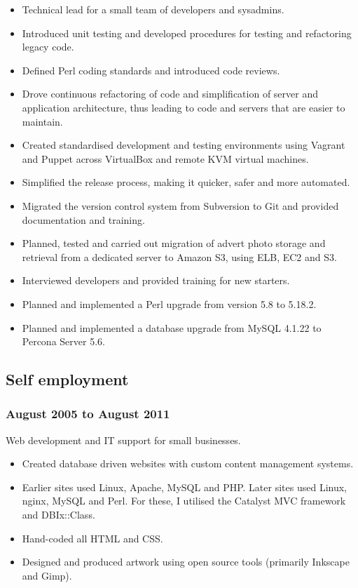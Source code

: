 \documentclass[10pt]{article}
\begin{document}
\begin{itemize}
    \item Technical lead for a small team of developers and sysadmins.
    \item Introduced unit testing and developed procedures for testing and refactoring
          legacy code.
    \item Defined Perl coding standards and introduced code reviews.
    \item Drove continuous refactoring of code and simplification of server and
          application architecture, thus leading to code and servers that are easier to
          maintain.
    \item Created standardised development and testing environments using Vagrant and
          Puppet across VirtualBox and remote KVM virtual machines.
    \item Simplified the release process, making it quicker, safer and more automated.
    \item Migrated the version control system from Subversion to Git and provided
          documentation and training.
    \item Planned, tested and carried out migration of advert photo storage and
          retrieval from a dedicated server to Amazon S3, using ELB, EC2 and S3.
    \item Interviewed developers and provided training for new starters.
    \item Planned and implemented a Perl upgrade from version 5.8 to 5.18.2.
    \item Planned and implemented a database upgrade from MySQL 4.1.22 to Percona
          Server 5.6.
\end{itemize}

\subsection{Self employment}
\subsubsection{August 2005 to August 2011}

Web development and IT support for small businesses.

\begin{itemize}
    \item Created database driven websites with custom content management systems.
    \item Earlier sites used Linux, Apache, MySQL and PHP.  Later sites used Linux,
          nginx, MySQL and Perl.  For these, I utilised the Catalyst MVC framework and
          DBIx::Class.
    \item Hand-coded all HTML and CSS.
    \item Designed and produced artwork using open source tools (primarily Inkscape
          and Gimp).
\end{itemize}
\end{document}
